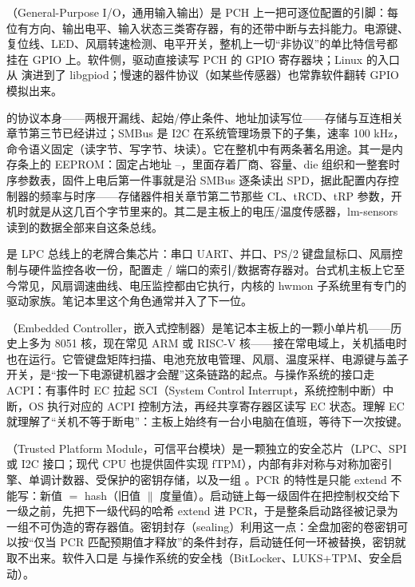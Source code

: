 （General-Purpose I/O，通用输入输出）是 PCH 上一把可逐位配置的引脚：每位有方向、输出电平、输入状态三类寄存器，有的还带中断与去抖能力。电源键、复位线、LED、风扇转速检测、电平开关，整机上一切“非协议”的单比特信号都挂在 GPIO 上。软件侧，驱动直接读写 PCH 的 GPIO 寄存器块；Linux 的入口从  演进到了 libgpiod；慢速的器件协议（如某些传感器）也常靠软件翻转 GPIO 模拟出来。

 的协议本身——两根开漏线、起始/停止条件、地址加读写位——存储与互连相关章节第三节已经讲过；SMBus 是 I2C 在系统管理场景下的子集，速率 100 kHz，命令语义固定（读字节、写字节、块读）。它在整机中有两条著名用途。其一是内存条上的  EEPROM：固定占地址 --，里面存着厂商、容量、die 组织和一整套时序参数表，固件上电后第一件事就是沿 SMBus 逐条读出 SPD，据此配置内存控制器的频率与时序——存储器件相关章节第二节那些 CL、tRCD、tRP 参数，开机时就是从这几百个字节里来的。其二是主板上的电压/温度传感器，lm-sensors 读到的数据全部来自这条总线。

 是 LPC 总线上的老牌合集芯片：串口 UART、并口、PS/2 键盘鼠标口、风扇控制与硬件监控各收一份，配置走 / 端口的索引/数据寄存器对。台式机主板上它至今常见，风扇调速曲线、电压监控都由它执行，内核的 hwmon 子系统里有专门的驱动家族。笔记本里这个角色通常并入了下一位。

（Embedded Controller，嵌入式控制器）是笔记本主板上的一颗小单片机——历史上多为 8051 核，现在常见 ARM 或 RISC-V 核——接在常电域上，关机插电时也在运行。它管键盘矩阵扫描、电池充放电管理、风扇、温度采样、电源键与盖子开关，是“按一下电源键机器才会醒”这条链路的起点。与操作系统的接口走 ACPI：有事件时 EC 拉起 SCI（System Control Interrupt，系统控制中断）中断，OS 执行对应的 ACPI 控制方法，再经共享寄存器区读写 EC 状态。理解 EC 就理解了“关机不等于断电”：主板上始终有一台小电脑在值班，等待下一次按键。

（Trusted Platform Module，可信平台模块）是一颗独立的安全芯片（LPC、SPI 或 I2C 接口；现代 CPU 也提供固件实现 fTPM），内部有非对称与对称加密引擎、单调计数器、受保护的密钥存储，以及一组 。PCR 的特性是只能 extend 不能写：新值 $=$ hash（旧值 $\|$ 度量值）。启动链上每一级固件在把控制权交给下一级之前，先把下一级代码的哈希 extend 进 PCR，于是整条启动路径被记录为一组不可伪造的寄存器值。密钥封存（sealing）利用这一点：全盘加密的卷密钥可以按“仅当 PCR 匹配预期值才释放”的条件封存，启动链任何一环被替换，密钥就取不出来。软件入口是  与操作系统的安全栈（BitLocker、LUKS+TPM、安全启动）。

